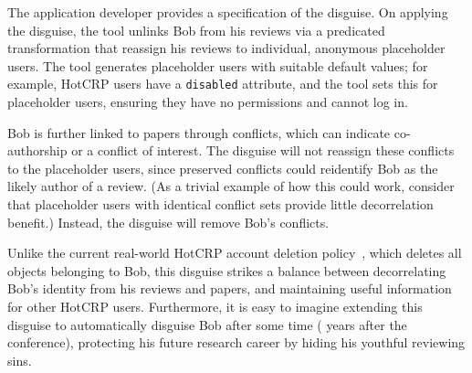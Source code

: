 %
The application developer provides a specification of the disguise.
%
On applying the disguise, the tool unlinks Bob from his reviews via a
predicated transformation that reassign his reviews to individual, anonymous
placeholder users.
%
%
The tool generates placeholder users with suitable default values; for
example, HotCRP users have a \texttt{disabled} attribute, and the tool sets
this for placeholder users, ensuring they have no permissions and cannot log
in.
%

%
Bob is further linked to papers through conflicts, which can
indicate co-authorship or a conflict of interest.
%
The disguise will not reassign these conflicts to the placeholder users,
since preserved conflicts could reidentify Bob as the likely author of a
review.
%
(As a trivial example of how this could work, consider that placeholder
users with identical conflict sets provide little decorrelation benefit.)
%
Instead, the disguise will remove Bob's conflicts.
%

Unlike the current real-world HotCRP account deletion policy~\cite{hotcrp:privacy},
which deletes all objects belonging to Bob, this disguise strikes a balance between
decorrelating Bob's identity from his reviews and papers, and maintaining useful
information for other HotCRP users.
%
Furthermore, it is easy to imagine extending this disguise to automatically disguise
Bob after some time ( years after the conference), protecting his future
research career by hiding his youthful reviewing sins.
%

